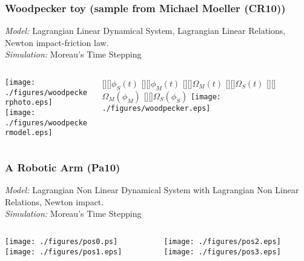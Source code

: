 \frame
{
  \frametitle{Woodpecker toy (sample from Michael Moeller (CR10))}
  \emph{Model:} Lagrangian Linear Dynamical System, Lagrangian Linear Relations, Newton impact-friction law. \\
  \emph{Simulation:} Moreau's Time Stepping
  \begin{columns}
    \begin{column}[t]{6cm}
      \begin{center}
        \texttt{[image: ./figures/woodpeckerphoto.eps]}\\
        \texttt{[image: ./figures/woodpeckermodel.eps]}\\
      \end{center}
    \end{column}
    \begin{column}[t]{6.5cm}
      \begin{center}  
        [][]{$\phi_S(t)$}
        [][]{$\phi_M(t)$}
        [][]{$\Omega_M(t)$}
        [][]{$\Omega_S(t)$}
        [][]{$\Omega_M(\phi_M)$}
        [][]{$\Omega_S(\phi_S)$}
       \texttt{[image: ./figures/woodpecker.eps]}\\
      \end{center}
    \end{column}
  \end{columns}
}

\frame
{
  \frametitle{A Robotic Arm (Pa10)}
  \emph{Model:} Lagrangian Non Linear Dynamical System with Lagrangian Non Linear Relations, Newton impact. \\
  \emph{Simulation:} Moreau's Time Stepping
  \begin{columns}
    \begin{column}[t]{6cm}
      \begin{center}
        \texttt{[image: ./figures/pos0.ps]}\\
        \texttt{[image: ./figures/pos1.eps]}\\
      \end{center}
    \end{column}
    \begin{column}[t]{6cm}
      \begin{center}  
        \texttt{[image: ./figures/pos2.eps]}\\
        \texttt{[image: ./figures/pos3.eps]}\\
      \end{center}
    \end{column}
  \end{columns}
}

